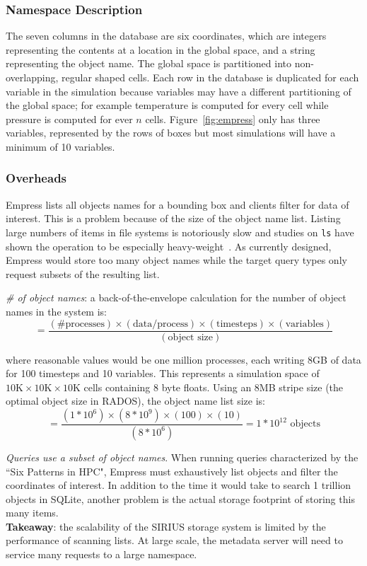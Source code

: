 \subsubsection{Namespace Description}

The seven columns in the database are six coordinates, which are integers
representing the contents at a location in the global space, and a string
representing the object name. The global space is partitioned into
non-overlapping, regular shaped cells.  Each row in the database is duplicated
for each variable in the simulation because variables may have a different
partitioning of the global space; for example temperature is computed for every
cell while pressure is computed for ever \(n\) cells.  Figure~\ref{fig:empress}
only has three variables, represented by the rows of boxes but most simulations
will have a minimum of 10 variables.

\subsubsection{Overheads}

Empress lists all objects names for a bounding box and clients filter for data
of interest. This is a problem because of the size of the object name list.
Listing large numbers of items in file systems is notoriously slow and studies
on \texttt{ls} have shown the operation to be especially
heavy-weight~\cite{carns:ipdps09-pvfs, eshel:fast10-panache}.  As currently
designed, Empress would store too many object names while the target query
types only request subsets of the resulting list.

\emph{\# of object names}: a back-of-the-envelope calculation for the number of
object names in the system is:
\[=\frac
  {(\text{\# processes})\times
   (\text{data/process})\times
   (\text{timesteps})\times
   (\text{variables})}
  {(\text{object size})}
\]

where reasonable values would be one million processes, each writing 8GB of
data for 100 timesteps and 10 variables. This represents a simulation space of
\(10\text{K}\times10\text{K}\times10\text{K}\) cells containing 8 byte floats.
Using an 8MB stripe size (the optimal object size in RADOS), the object name
list size is: \[=\frac{(1*10^6)\times(8*10^{9})\times(100)\times(10)}{(8*10^6)}
= 1*10^{12} \text{ objects} \]

\emph{Queries use a subset of object names}. When running queries characterized
by the ``Six Patterns in HPC", Empress must exhaustively list objects and
filter the coordinates of interest.  In addition to the time it would take to
search 1 trillion objects in SQLite, another problem is the actual storage
footprint of storing this many items.\\

 \noindent\textbf{Takeaway}: the scalability of the SIRIUS storage system is
limited by the performance of scanning lists. At large scale, the metadata
server will need to service many requests to a large namespace.
